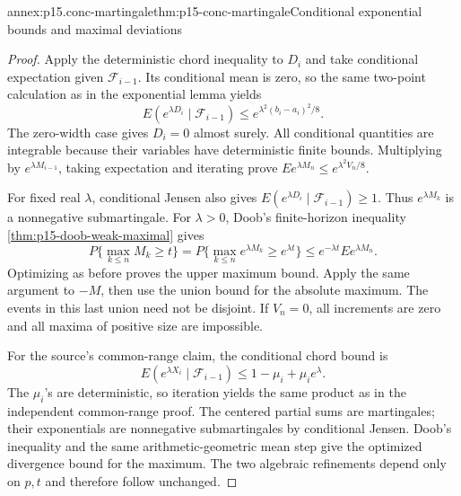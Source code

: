 \begin{annexitem}{annex:p15.conc-martingale}{thm:p15-conc-martingale}{Conditional exponential bounds and maximal deviations}
\begin{proof}
Apply the deterministic chord inequality to \(D_i\)
and take conditional expectation given \(\mathcal F_{i-1}\).
Its conditional mean is zero, so the same two-point
calculation as in the exponential lemma yields
\[
 E(e^{\lambda D_i}\mid\mathcal F_{i-1})
                  \leq e^{\lambda^2(b_i-a_i)^2/8}.
\]
The zero-width case gives \(D_i=0\) almost surely.
All conditional quantities are integrable because their
variables have deterministic finite bounds.
Multiplying by \(e^{\lambda M_{i-1}}\), taking expectation
and iterating prove
\(Ee^{\lambda M_n}\leq e^{\lambda^2V_n/8}\).

For fixed real \(\lambda\), conditional Jensen also gives
\(E(e^{\lambda D_i}\mid\mathcal F_{i-1})\geq1\).
Thus \(e^{\lambda M_k}\) is a nonnegative submartingale.
For \(\lambda>0\), Doob's finite-horizon inequality
\cref{thm:p15-doob-weak-maximal} gives
\[
 P\{\max_{k\leq n}M_k\geq t\}
   =P\{\max_{k\leq n}e^{\lambda M_k}\geq e^{\lambda t}\}
   \leq e^{-\lambda t}Ee^{\lambda M_n}.
\]
Optimizing as before proves the upper maximum bound.
Apply the same argument to \(-M\), then use the union
bound for the absolute maximum. The events in this
last union need not be disjoint. If \(V_n=0\), all
increments are zero and all maxima of positive size
are impossible.

For the source's common-range claim, the conditional chord
bound is
\[
 E(e^{\lambda X_i}\mid\mathcal F_{i-1})
                 \leq1-\mu_i+\mu_i e^\lambda.
\]
The \(\mu_i\)'s are deterministic, so iteration yields
the same product as in the independent common-range proof.
The centered partial sums are martingales; their
exponentials are nonnegative submartingales by conditional
Jensen. Doob's inequality and the same arithmetic-geometric
mean step give the optimized divergence bound for the
maximum. The two algebraic refinements depend only on
\(p,t\) and therefore follow unchanged.
\end{proof}
\end{annexitem}

